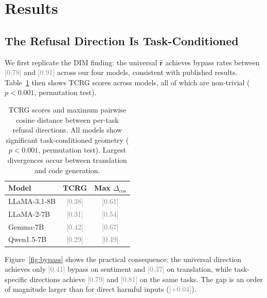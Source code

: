 \documentclass[11pt]{article}
\newcommand{\ph}[1]{\textcolor{gray}{[#1]}}
\newcommand{\tcrg}{\textsc{TCRG}}
\begin{document}
\section{Results}
\label{sec:results}

\subsection{The Refusal Direction Is Task-Conditioned}

We first replicate the DIM finding: the universal $\hat{\mathbf{r}}$ achieves bypass rates between \ph{0.78} and \ph{0.91} across our four models, consistent with published results. Table~\ref{tab:tcrg} then shows \tcrg{} scores across models, all of which are non-trivial ($p < 0.001$, permutation test).

\begin{table}[h]
\centering
\small
\setlength{\tabcolsep}{6pt}
\begin{tabular}{lcc}
\toprule
Model & \tcrg{} & Max $\Delta_\text{cos}$ \\
\midrule
LLaMA-3.1-8B & \ph{0.38} & \ph{0.61} \\
LLaMA-2-7B   & \ph{0.31} & \ph{0.54} \\
Gemma-7B     & \ph{0.42} & \ph{0.67} \\
Qwen1.5-7B   & \ph{0.29} & \ph{0.49} \\
\bottomrule
\end{tabular}
\caption{\tcrg{} scores and maximum pairwise cosine distance between per-task refusal directions. All models show significant task-conditioned geometry ($p < 0.001$, permutation test). Largest divergences occur between translation and code generation.}
\label{tab:tcrg}
\end{table}

Figure~\ref{fig:bypass} shows the practical consequence: the universal direction achieves only \ph{0.41} bypass on sentiment and \ph{0.37} on translation, while task-specific directions achieve \ph{0.79} and \ph{0.81} on the same tasks. The gap is an order of magnitude larger than for direct harmful inputs (\ph{+0.04}).
\end{document}
